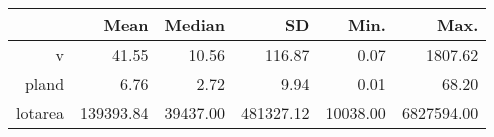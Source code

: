 \begin{table}[ht]
\centering
\begin{tabular}{rrrrrr}
  \hline
 & Mean & Median & SD & Min. & Max. \\ 
  \hline
v & 41.55 & 10.56 & 116.87 & 0.07 & 1807.62 \\ 
  pland & 6.76 & 2.72 & 9.94 & 0.01 & 68.20 \\ 
  lotarea & 139393.84 & 39437.00 & 481327.12 & 10038.00 & 6827594.00 \\ 
   \hline
\end{tabular}
\end{table}
